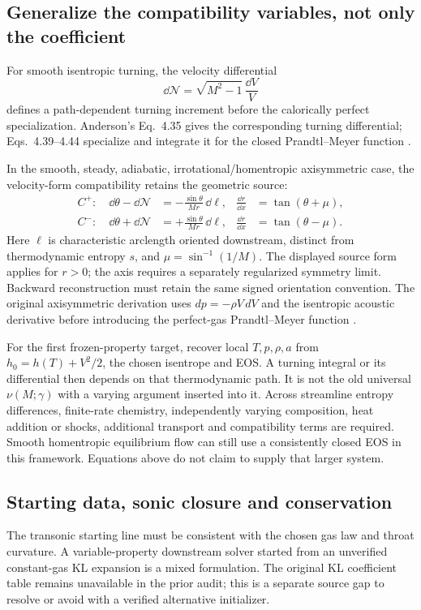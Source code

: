 \subsection{Generalize the compatibility variables, not only the coefficient}
For smooth isentropic turning, the velocity differential
\begin{equation}
\dd\mathcal{N}=\sqrt{M^2-1}\,\frac{\dd V}{V}
\label{eq:turning}
\end{equation}
defines a path-dependent turning increment before the calorically perfect
specialization. Anderson's Eq.~4.35 gives the corresponding turning
differential; Eqs.~4.39--4.44 specialize and integrate
it for the closed Prandtl--Meyer function
\cite[\S4.14, PDF pp.~186--187]{anderson}.

In the smooth, steady, adiabatic, irrotational/homentropic axisymmetric
case, the velocity-form compatibility retains the geometric source:
\begin{align}
C^+:\quad \dd\theta-\dd\mathcal{N}
&=-\frac{\sin\theta}{Mr}\,\dd\ell,
&\frac{\dd r}{\dd x}&=\tan(\theta+\mu),\\
C^-:\quad \dd\theta+\dd\mathcal{N}
&=+\frac{\sin\theta}{Mr}\,\dd\ell,
&\frac{\dd r}{\dd x}&=\tan(\theta-\mu).
\end{align}
Here \(\ell\) is characteristic arclength oriented downstream, distinct
from thermodynamic entropy \(s\), and \(\mu=\sin^{-1}(1/M)\).
The displayed source form applies for \(r>0\); the axis requires a
separately regularized symmetry limit. Backward reconstruction must
retain the same signed orientation convention.
The original axisymmetric derivation uses \(dp=-\rho V\,dV\) and the
isentropic acoustic derivative before introducing the perfect-gas
Prandtl--Meyer function
\cite[\S11.4, PDF p.~408; \S11.8, PDF pp.~420--422,
especially Eq.~11.51]{anderson}.

For the first frozen-property target, recover local \(T,p,\rho,a\) from
\(h_0=h(T)+V^2/2\), the chosen isentrope and EOS. A turning integral or
its differential then depends on that thermodynamic path. It is not the
old universal \(\nu(M;\gamma)\) with a varying argument inserted into it.
Across streamline entropy differences, finite-rate chemistry,
independently varying composition, heat addition or shocks, additional
transport and compatibility terms are required. Smooth homentropic
equilibrium flow can still use a consistently closed EOS in this framework.
Equations above do not claim to supply that larger system.

\subsection{Starting data, sonic closure and conservation}
The transonic starting line must be consistent with the chosen gas law
and throat curvature. A variable-property downstream solver started from
an unverified constant-gas KL expansion is a mixed formulation. The
original KL coefficient table remains unavailable in the prior audit;
this is a separate source gap to resolve or avoid with a verified
alternative initializer.

